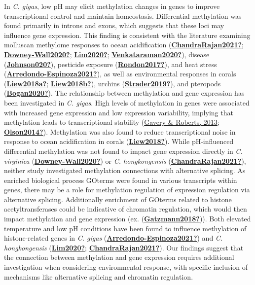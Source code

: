 \documentclass [11pt, proquest] {uwthesis}[2015/03/03]
\begin{document}
In \emph{C. gigas}, low pH may elicit methylation changes in genes to improve transcriptional control and maintain homeostasis. Differential methylation was found primarily in introns and exons, which suggests that these loci may influence gene expression. This finding is consistent with the literature examining molluscan methylome responses to ocean acidification (\protect\hyperlink{ref-ChandraRajan2021}{\textbf{ChandraRajan2021?}}; \protect\hyperlink{ref-Downey-Wall2020}{\textbf{Downey-Wall2020?}}; \protect\hyperlink{ref-Lim2020}{\textbf{Lim2020?}}; \protect\hyperlink{ref-Venkataraman2020}{\textbf{Venkataraman2020?}}), disease (\protect\hyperlink{ref-Johnson020}{\textbf{Johnson020?}}), pesticide exposure (\protect\hyperlink{ref-Rondon2017}{\textbf{Rondon2017?}}), and heat stress (\protect\hyperlink{ref-Arredondo-Espinoza2021}{\textbf{Arredondo-Espinoza2021?}}), as well as environmental responses in corals (\protect\hyperlink{ref-Liew2018a}{\textbf{Liew2018a?}}; \protect\hyperlink{ref-Liew2018b}{\textbf{Liew2018b?}}), urchins (\protect\hyperlink{ref-Strader2019}{\textbf{Strader2019?}}), and pteropods (\protect\hyperlink{ref-Bogan2020}{\textbf{Bogan2020?}}). The relationship between methylation and gene expression has been investigated in \emph{C. gigas}. High levels of methylation in genes were associated with increased gene expression and low expression variability, implying that methylation leads to transcriptional stability (\protect\hyperlink{ref-Gavery2013}{Gavery \& Roberts, 2013}; \protect\hyperlink{ref-Olson2014}{\textbf{Olson2014?}}). Methylation was also found to reduce transcriptional noise in response to ocean acidification in corals (\protect\hyperlink{ref-Liew2018}{\textbf{Liew2018?}}). While pH-influenced differential methylation was not found to impact gene expression directly in \emph{C. virginica} (\protect\hyperlink{ref-Downey-Wall2020}{\textbf{Downey-Wall2020?}}) or \emph{C. hongkongensis} (\protect\hyperlink{ref-ChandraRajan2021}{\textbf{ChandraRajan2021?}}), neither study investigated methylation connections with alternative splicing. As enriched biological process GOterms were found in various transcripts within genes, there may be a role for methylation regulation of expression regulation via alternative splicing. Additionally enrichment of GOterms related to histone acetyltransferases could be indicative of chromatin regulation, which would then impact methylation and gene expression (ex. (\protect\hyperlink{ref-Gatzmann2018}{\textbf{Gatzmann2018?}})). Both elevated temperature and low pH conditions have been found to influence methylation of histone-related genes in \emph{C. gigas} (\protect\hyperlink{ref-Arredondo-Espinoza2021}{\textbf{Arredondo-Espinoza2021?}}) and \emph{C. hongkongensis} (\protect\hyperlink{ref-Lim2020}{\textbf{Lim2020?}}; \protect\hyperlink{ref-ChandraRajan2021}{\textbf{ChandraRajan2021?}}). Our findings suggest that the connection between methylation and gene expression requires additional investigation when considering environmental response, with specific inclusion of mechanisms like alternative splicing and chromatin regulation.
\end{document}
